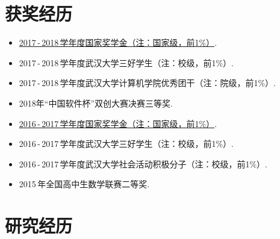 \documentclass[letterpaper,AutoFakeBold]{twentysecondcv} %
\begin{document}



\section{\large 获奖经历}


\begin{itemize}
	\setlength{\itemsep}{0pt}
	\setlength{\parsep}{0pt}
	\setlength{\parskip}{0pt}
	\item
	\href{https://raw.githubusercontent.com/RMSnow/CV/master/materials/NationalScholarship.jpg} 
	{2017\,-\,2018\,学年度国家奖学金（注：国家级，前1\%）}.
	\item 2017\,-\,2018\,学年度武汉大学三好学生（注：校级，前1\%）.
	\item 2017\,-\,2018\,学年度武汉大学计算机学院优秀团干（注：院级，前1\%）.
	\item 2018年“中国软件杯”双创大赛决赛三等奖.
	\item \href{https://raw.githubusercontent.com/RMSnow/CV/master/materials/NationalScholarship.jpg}
	{2016\,-\,2017\,学年度国家奖学金（注：国家级，前1\%）}.
	\item 2016\,-\,2017\,学年度武汉大学三好学生（注：校级，前1\%）.
	\item 2016\,-\,2017\,学年度武汉大学社会活动积极分子（注：校级，前1\%）.
	\item 2015\,年全国高中生数学联赛二等奖.
\end{itemize}



\section{\large 研究经历}
\end{document}
